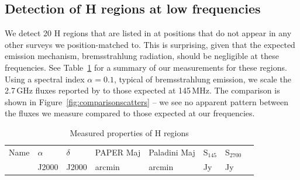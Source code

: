 \documentclass[useAMS,usenatbib]{mn2e}
\begin{document}

\subsection{Detection of {H} regions at low frequencies}
We detect 20 {H} regions that are listed in \cite{Paladini.03} at positions that do not appear in any other surveys we position-matched to. This is surprising, given that the expected emission mechanism, bremsstrahlung radiation, should be negligible at these frequencies. See Table~\ref{tab:hii} for a summary of our measurements for these regions. Using a spectral index $\alpha=0.1$, typical of bremsstrahlung emission, we scale the 2.7\,GHz fluxes reported by \cite{Paladini.03} to those expected at 145\,MHz. The comparison is shown in Figure~\ref{fig:comparisonscatters} -- we see no apparent pattern between the fluxes we measure compared to those expected at our frequencies.

\begin{table}
\caption{Measured properties of {H} regions}
\begin{tabular}{llllllll}
\hline
Name &  $\alpha$   &  $\delta$  &  PAPER Maj   &  Paladini Maj &  S$_{145}$  &  S$_{2700}$\\
 & J2000  &  J2000  &  arcmin  &  arcmin  &  Jy  &  Jy\\
\hline

\end{tabular}
\label{tab:hii}
\end{table}
\end{document}
